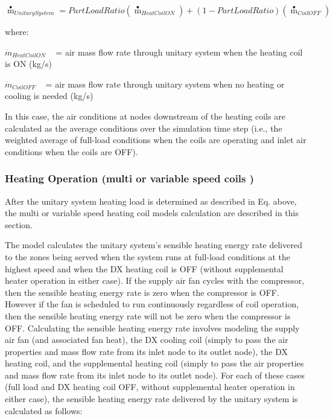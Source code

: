 \begin{equation}
{{\mathop m\limits^ \bullet  }_{UnitarySystem}} = PartLoadRatio\left( {{{\mathop m\limits^ \bullet  }_{HeatCoilON}}} \right) + \left( {1 - PartLoadRatio} \right)\left( {{{\mathop m\limits^ \bullet  }_{CoilOFF}}} \right)
\end{equation}

where:

\({\dot m_{HeatCoilON}}\) ~ = air mass flow rate through unitary system when the heating coil is ON (kg/s)

\({\dot m_{CoilOFF}}\) ~ = air mass flow rate through unitary system when no heating or cooling is needed (kg/s)

In this case, the air conditions at nodes downstream of the heating coils are calculated as the average conditions over the simulation time step (i.e., the weighted average of full-load conditions when the coils are operating and inlet air conditions when the coils are OFF).

\subsubsection{Heating Operation (multi or variable speed coils )}\label{heating-operation-multi-or-variable-speed-coils}

After the unitary system heating load is determined as described in Eq. above, the multi or variable speed heating coil models calculation are described in this section.

The model calculates the unitary system's sensible heating energy rate delivered to the zones being served when the system runs at full-load conditions at the highest speed and when the DX heating coil is OFF (without supplemental heater operation in either case). If the supply air fan cycles with the compressor, then the sensible heating energy rate is zero when the compressor is OFF. However if the fan is scheduled to run continuously regardless of coil operation, then the sensible heating energy rate will not be zero when the compressor is OFF. Calculating the sensible heating energy rate involves modeling the supply air fan (and associated fan heat), the DX cooling coil (simply to pass the air properties and mass flow rate from its inlet node to its outlet node), the DX heating coil, and the supplemental heating coil (simply to pass the air properties and mass flow rate from its inlet node to its outlet node). For each of these cases (full load and DX heating coil OFF, without supplemental heater operation in either case), the sensible heating energy rate delivered by the unitary system is calculated as follows:

